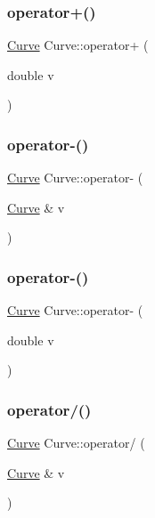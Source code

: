 \subsubsection{\texorpdfstring{operator+()}{operator+()}\hspace{0.1cm}{\footnotesize\ttfamily [2/2]}}
{\footnotesize\ttfamily \hyperlink{class_curve}{Curve} Curve\+::operator+ (\begin{DoxyParamCaption}\item[{double}]{v }\end{DoxyParamCaption})}

\mbox{\label{class_curve_a55facce84fd4b5bd58124772735c9248}} 
\subsubsection{\texorpdfstring{operator-\/()}{operator-()}\hspace{0.1cm}{\footnotesize\ttfamily [1/2]}}
{\footnotesize\ttfamily \hyperlink{class_curve}{Curve} Curve\+::operator-\/ (\begin{DoxyParamCaption}\item[{\hyperlink{class_curve}{Curve} \&}]{v }\end{DoxyParamCaption})}

\mbox{\label{class_curve_a1f487e5943b841112dd72c077dee56f6}} 
\subsubsection{\texorpdfstring{operator-\/()}{operator-()}\hspace{0.1cm}{\footnotesize\ttfamily [2/2]}}
{\footnotesize\ttfamily \hyperlink{class_curve}{Curve} Curve\+::operator-\/ (\begin{DoxyParamCaption}\item[{double}]{v }\end{DoxyParamCaption})}

\mbox{\label{class_curve_abec3bbbc40b1c643ccb31299dfd53a4d}} 
\subsubsection{\texorpdfstring{operator/()}{operator/()}\hspace{0.1cm}{\footnotesize\ttfamily [1/2]}}
{\footnotesize\ttfamily \hyperlink{class_curve}{Curve} Curve\+::operator/ (\begin{DoxyParamCaption}\item[{\hyperlink{class_curve}{Curve} \&}]{v }\end{DoxyParamCaption})}

